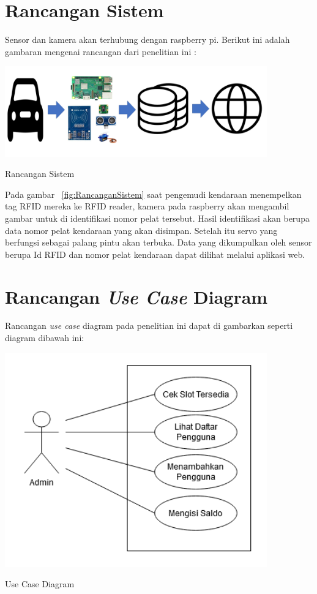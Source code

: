 \section{Rancangan Sistem}
Sensor dan kamera akan terhubung dengan raspberry pi. Berikut ini adalah gambaran mengenai rancangan dari penelitian ini :

\begin{afigure} 
    \includegraphics[width=0.85\textwidth, center]{images/rancangan sistem.png}
    \caption{Rancangan Sistem}
    \label{fig:RancanganSistem}
\end{afigure}

Pada gambar ~\ref{fig:RancanganSistem} saat pengemudi kendaraan menempelkan tag RFID mereka ke RFID reader, kamera pada raspberry akan mengambil gambar untuk di identifikasi nomor pelat tersebut. Hasil identifikasi akan berupa data nomor pelat kendaraan yang akan disimpan. Setelah itu servo yang berfungsi sebagai palang pintu akan terbuka. Data yang dikumpulkan oleh sensor berupa Id RFID dan nomor pelat kendaraan dapat dilihat melalui aplikasi web.

\section{Rancangan \textit{Use Case} Diagram}
Rancangan \textit{use case} diagram pada penelitian ini dapat di gambarkan seperti diagram dibawah ini:

\begin{afigure} 
    \includegraphics[width=0.85\textwidth, center]{images/Use Case Diagram.png}
    \caption{Use Case Diagram}
    \label{fig:usecasediagram}
\end{afigure}

